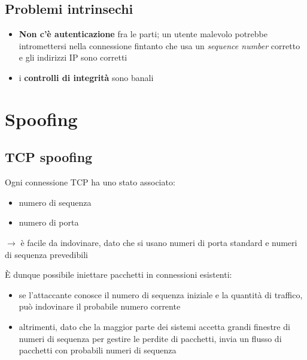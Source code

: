 \subsection{Problemi intrinsechi}
\begin{itemize}
    \item \textbf{Non c'è autenticazione} fra le parti; un utente malevolo potrebbe 
    intromettersi nella connessione fintanto che usa un \textit{sequence number} corretto 
    e gli indirizzi IP sono corretti 
    \item i \textbf{controlli di integrità} sono banali
\end{itemize}

\section{Spoofing}

\subsection{TCP spoofing}
Ogni connessione TCP ha uno stato associato:
\begin{itemize}
    \item numero di sequenza 
    \item numero di porta 
\end{itemize}

$\rightarrow$ è facile da indovinare, dato che si usano numeri di porta standard e numeri 
di sequenza prevedibili

\noindent È dunque possibile iniettare pacchetti in connessioni esistenti:
\begin{itemize}
    \item se l'attaccante conosce il numero di sequenza iniziale e la quantità di traffico, può indovinare 
    il probabile numero corrente 
    \item altrimenti, dato che la maggior parte dei sistemi accetta grandi finestre di numeri di sequenza per gestire 
    le perdite di pacchetti, invia un flusso di pacchetti con probabili numeri di sequenza
\end{itemize}